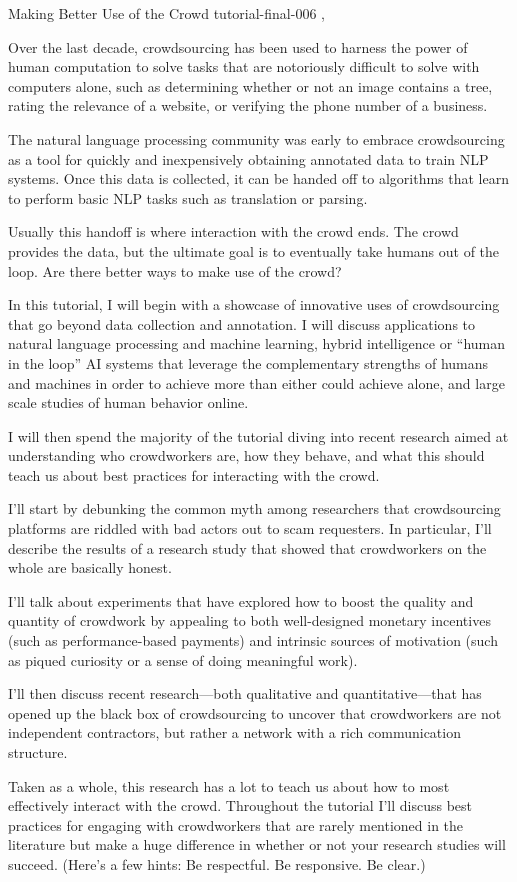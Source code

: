 \begin{tutorial}
  {Making Better Use of the Crowd}
  {tutorial-final-006}
  {\daydateyear, \tutorialafternoontime}
  {\TutLocF}

Over the last decade, crowdsourcing has been used to harness the power of human computation to solve tasks that are notoriously difficult to solve with computers alone, such as determining whether or not an image contains a tree, rating the relevance of a website, or verifying the phone number of a business.

The natural language processing community was early to embrace crowdsourcing as a tool for quickly and inexpensively obtaining annotated data to train NLP systems. Once this data is collected, it can be handed off to algorithms that learn to perform basic NLP tasks such as translation or parsing.

Usually this handoff is where interaction with the crowd ends. The crowd provides the data, but the ultimate goal is to eventually take humans out of the loop. Are there better ways to make use of the crowd?

In this tutorial, I will begin with a showcase of innovative uses of crowdsourcing that go beyond data collection and annotation. I will discuss applications to natural language processing and machine learning, hybrid intelligence or “human in the loop” AI systems that leverage the complementary strengths of humans and machines in order to achieve more than either could achieve alone, and large scale studies of human behavior online.

I will then spend the majority of the tutorial diving into recent research aimed at understanding who crowdworkers are, how they behave, and what this should teach us about best practices for interacting with the crowd.

I’ll start by debunking the common myth among researchers that crowdsourcing platforms are riddled with bad actors out to scam requesters. In particular, I’ll describe the results of a research study that showed that crowdworkers on the whole are basically honest.

I’ll talk about experiments that have explored how to boost the quality and quantity of crowdwork by appealing to both well-designed monetary incentives (such as performance-based payments) and intrinsic sources of motivation (such as piqued curiosity or a sense of doing meaningful work).

I’ll then discuss recent research—both qualitative and quantitative—that has opened up the black box of crowdsourcing to uncover that crowdworkers are not independent contractors, but rather a network with a rich communication structure.

Taken as a whole, this research has a lot to teach us about how to most effectively interact with the crowd. Throughout the tutorial I’ll discuss best practices for engaging with crowdworkers that are rarely mentioned in the literature but make a huge difference in whether or not your research studies will succeed. (Here’s a few hints: Be respectful. Be responsive. Be clear.)
\end{tutorial}
